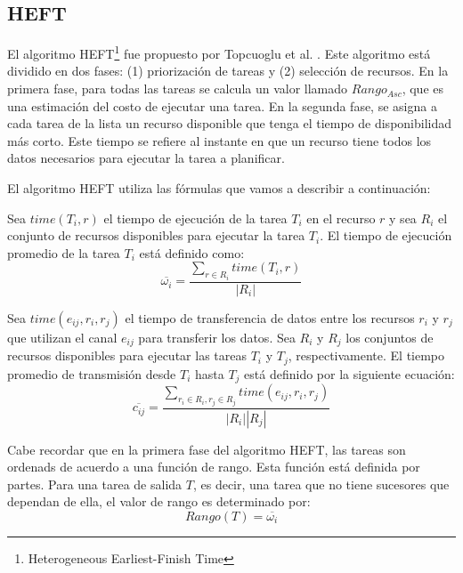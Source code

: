 \subsection{HEFT}
El algoritmo HEFT\footnote{Heterogeneous Earliest-Finish Time} fue propuesto por Topcuoglu et al. \cite{topcuoglu2002performance}. Este algoritmo está dividido en dos fases: (1) priorización de tareas y (2) selección de recursos. En la primera fase, para todas las tareas se calcula un valor llamado $Rango_{Asc}$, que es una estimación del costo de ejecutar una tarea. En la segunda fase, se asigna a cada tarea de la lista un recurso disponible que tenga el tiempo de disponibilidad más corto. Este tiempo se refiere al instante en que un recurso tiene todos los datos necesarios para ejecutar la tarea a planificar.




El algoritmo HEFT utiliza las fórmulas que vamos a describir a continuación:


Sea $time(T_i, r)$ el tiempo de ejecución de la tarea $T_i$ en el recurso $r$ y sea $R_i$ el conjunto de recursos disponibles para ejecutar la tarea $T_i$. El tiempo de ejecución promedio de la tarea $T_i$ está definido como:
\begin{equation}
\label{ecc:heft1}
\overline{\omega_i} = \frac{\sum_{r \in R_i} time(T_i, r)}{|R_i|}
\end{equation}

Sea $time(e_{ij}, r_i, r_j)$ el tiempo de transferencia de datos entre los recursos $r_i$ y $r_j$ que utilizan el canal $e_{ij}$ para transferir los datos. Sea $R_i$ y $R_j$ los conjuntos de recursos disponibles para ejecutar las tareas $T_i$ y $T_j$, respectivamente. El tiempo promedio de transmisión desde $T_i$ hasta $T_j$ está definido por la siguiente ecuación:
\begin{equation}
\label{ecc:heft2}
\overline{c_{ij}} = \frac{ \sum_{r_i \in R_i, r_j \in R_j} {time(e_{ij}, r_i, r_j)} }{|R_i| |R_j|}
\end{equation}

Cabe recordar que en la primera fase del algoritmo HEFT, las tareas son ordenads de acuerdo a una función de rango. Esta función está definida por partes. Para una tarea de salida $T$, es decir, una tarea que no tiene sucesores que dependan de ella, el valor de rango es determinado por:
\begin{equation}
\label{ecc:heft3}
Rango(T) = \overline{\omega_i}
\end{equation}


